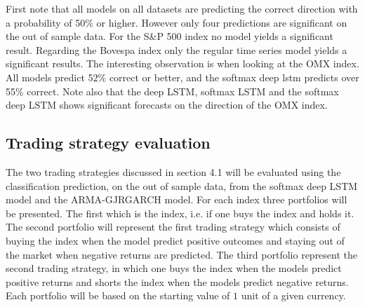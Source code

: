 \documentclass[12pt, letterpaper]{amsart}%
\begin{document}
First note that all models on all datasets are predicting the correct direction with a probability of 50\% or higher. However only four predictions are significant on the out of sample data. For the S\&P 500 index no model yields a significant result. Regarding the Bovespa index only the regular time series model yields a significant results. The interesting observation is when looking at the OMX index. All models predict 52\% correct or better, and the softmax deep lstm predicts over 55\% correct. Note also that the deep LSTM, softmax LSTM and the softmax deep LSTM shows significant forecasts on the direction of the OMX index.

\subsection{Trading strategy evaluation}
The two trading strategies discussed in section 4.1 will be evaluated using the classification prediction, on the out of sample data, from the softmax deep LSTM model and the ARMA-GJRGARCH model. For each index three portfolios will be presented. The first which is the index, i.e. if one buys the index and holds it. The second portfolio will represent the first trading strategy which consists of buying the index when the model predict positive outcomes and staying out of the market when negative returns are predicted. The third portfolio represent the second trading strategy, in which one buys the index when the models predict positive returns and shorts the index when the models predict negative returns. Each portfolio will be based on the starting value of $1$ unit of a given currency.
\\
\end{document}
